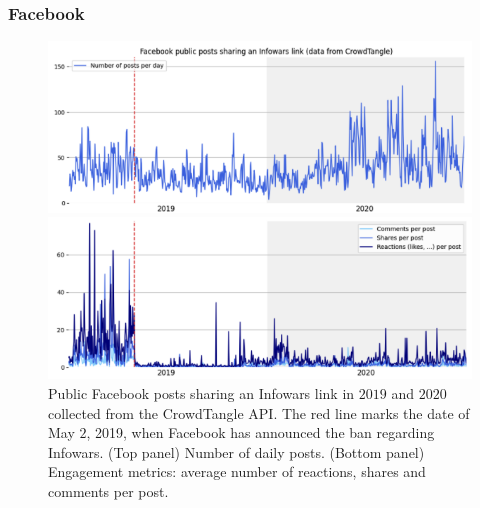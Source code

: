 \documentclass{article}
\begin{document}
\subsubsection{Facebook}

\begin{figure}
	\centering
	
	\begin{multicols}{1}
		\includegraphics[scale=0.35]{./img/infowars/fb_infowars_1.png}
	\end{multicols}
	
	\begin{multicols}{1}
		\includegraphics[scale=0.35]{./img/infowars/fb_infowars_2.png} 
	\end{multicols}
	
	\caption{Public Facebook posts sharing an Infowars link in $2019$ and $2020$ collected from the CrowdTangle API. The red line marks the date of May $2$, 2019, when Facebook has announced the ban regarding Infowars. (Top panel) Number of daily posts. (Bottom panel) Engagement metrics: average number of reactions, shares and comments per post. }
	\label{infowars1}
\end{figure}
\end{document}
